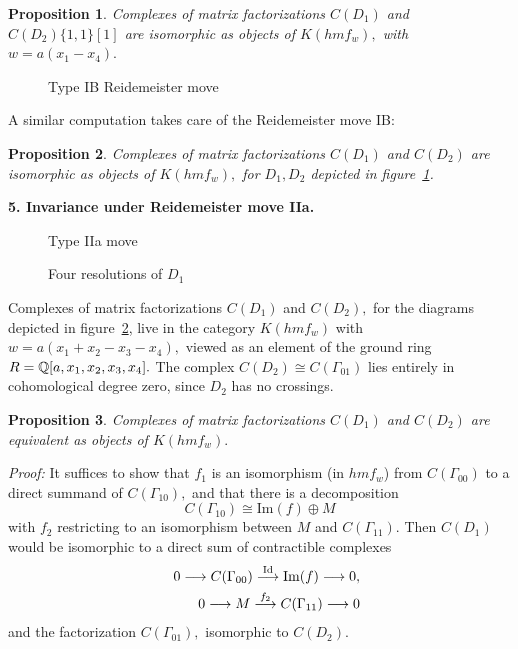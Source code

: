 \documentclass[12pt]{article}
\newtheorem{prop}{Proposition}
\begin{document}
\begin{prop} Complexes of matrix factorizations 
 $C(D_1)$ and $C(D_2)\{1,1\}[1]$ are isomorphic as objects of $K(hmf_w),$
with $w=a(x_1-x_4).$  
\end{prop} 

\begin{figure}  \caption{Type IB Reidemeister move} 
 \label{curl1b} \end{figure}

A similar computation takes care of the Reidemeister move IB: 

\begin{prop} Complexes of matrix factorizations 
  $C(D_1)$ and $C(D_2)$ are isomorphic as objects of $K(hmf_w),$
for $D_1, D_2$ depicted in figure~\ref{curl1b}.
\end{prop} 

\vspace{0.1in} 





{\bf 5. Invariance under Reidemeister move IIa.}

 \begin{figure} [htb] \caption{Type IIa move}
 \label{ta1}
 \end{figure}

 \begin{figure} [htb] \caption{Four resolutions
 of $D_1$}
 \label{reid2a}
 \end{figure}

Complexes of matrix factorizations $C(D_1)$ and $C(D_2),$ for the diagrams 
depicted in figure~\ref{ta1}, live in the category $K(hmf_w)$ with 
$w=a(x_1+x_2-x_3-x_4),$ viewed as an element of the ground ring 
$R=\mathbb Q[a,x_1, x_2,x_3,x_4].$ The complex $C(D_2)\cong C(\Gamma_{01})$ lies 
entirely in cohomological degree zero, since $D_2$ has no crossings. 

\begin{prop} \label{rei-m-t} Complexes of matrix factorizations 
  $C(D_1)$ and $C(D_2)$ are equivalent as objects of $K(hmf_w).$ 
\end{prop} 

\emph{Proof:} It suffices to show that
$f_1$ is an isomorphism (in $hmf_w$) from $C(\Gamma_{00})$ 
to a direct summand of $C(\Gamma_{10}),$ and that there is a decomposition 
$$C(\Gamma_{10}) \cong \mathrm{Im}(f) \oplus M$$ 
with $f_2$ restricting to an isomorphism between $M$ and $C(\Gamma_{11}).$ 
Then $C(D_1)$ would be isomorphic to a direct sum of 
contractible complexes 
\begin{eqnarray*} 
& & 0 \longrightarrow C(\Gamma_{00}) \stackrel{\mathrm{Id}}{\longrightarrow} \mathrm{Im}(f) \longrightarrow 0, \\
& & 0 \longrightarrow M \stackrel{f_2}{\longrightarrow} C(\Gamma_{11}) \longrightarrow 0
\end{eqnarray*} 
and the factorization $C(\Gamma_{01}),$ isomorphic to  $C(D_2).$ 
\end{document}

